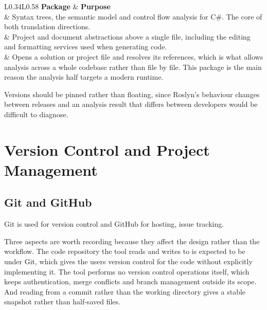 \begin{table}[htbp]
	\centering
	\caption{Roslyn packages}\label{tab:roslyn-packages}
	\begin{tabular}{L{0.34\textwidth}L{0.58\textwidth}}
\toprule
	\textbf{Package} & \textbf{Purpose} \\
	\midrule
{} & Syntax trees, the
	semantic model and control flow analysis for C\#. The core of both translation
	directions. \\
	\addlinespace
	 & Project
	and document abstractions above a single file, including the editing and
	formatting services used when generating code. \\
	\addlinespace
	 & Opens a
	solution or project file and resolves its references, which is what allows
	analysis across a whole codebase rather than file by file. This package is the
	main reason the analysis half targets a modern runtime. \\
	\bottomrule
	\end{tabular}
\end{table}

Versions should be pinned rather than floating, since Roslyn's behaviour changes
between releases and an analysis result that differs between developers would be
difficult to diagnose.

\section{Version Control and Project Management}

\subsection{Git and GitHub}

Git is used for version control and GitHub for hosting, issue tracking.

Three aspects are worth recording because they affect the design rather than 
the workflow. The code repository the tool reads and writes to is expected to be
under Git, which gives the users version control for the code without explicitly 
implementing it. The tool performs no version control operations itself, which 
keeps authentication, merge conflicts and branch management outside its scope. 
And reading from a commit rather than the working directory gives a stable snapshot 
rather than half-saved files.

